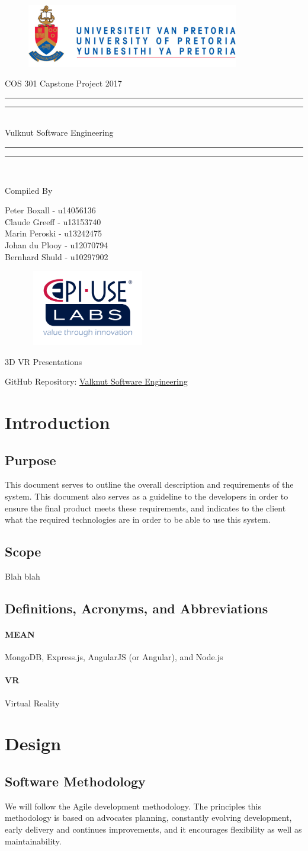 \documentclass{article}
\newcommand*{\titleGP}{\begingroup
		\begin{figure}[t]
			\centering
			\includegraphics[width=350px]{UP_Logo.PNG}
		\end{figure}		
\centering

{\Large COS 301 Capstone Project 2017}

\vspace*{\baselineskip}

\rule{\textwidth}{1.6pt}\vspace*{-\baselineskip}\vspace*{2pt}
\rule{\textwidth}{0.4pt}\\[\baselineskip]

{\Huge Vulknut Software Engineering } \\ [0.2\baselineskip]
\rule{\textwidth}{0.4pt}\vspace*{-\baselineskip}\vspace{3.2pt}
\rule{\textwidth}{1.6pt}\\[\baselineskip] %



\bigskip

Compiled By \\[\baselineskip]

\bigskip

{\Large Peter Boxall - u14056136 \\ Claude Greeff - u13153740 \\ Marin Peroski -  u13242475 \\ Johan du Plooy - u12070794 \\ Bernhard Shuld - u10297902 \\\par}

\bigskip
\bigskip
 
	\begin{figure}[H]
			\centering
			\includegraphics[width=200px,height=125px]{epiUse.PNG}
	\end{figure}
	
\bigskip
\bigskip

 {\Huge 3D VR Presentations}

\vfill
 
 	{\large GitHub Repository:  
 	\href{https://github.com/Valknut-Software-Engineering/Capstone_Project}{Valknut Software Engineering}\par} 

\endgroup}
\begin{document}
\titleGP
\newpage
\tableofcontents
\newpage

\section{Introduction}

	\subsection{Purpose}
	This document serves to outline the overall description and requirements of 	the system. This document also serves as a guideline to the developers in 		order to ensure the final product meets these requirements, and indicates 		to the client what the required technologies are in order to be able to use 	this system.
	
	\subsection{Scope}
	
	Blah blah	
	
	\subsection{Definitions, Acronyms, and Abbreviations}
			\paragraph{MEAN}	MongoDB, Express.js, AngularJS (or Angular), and Node.js
			\paragraph{VR}	Virtual Reality

\section{Design}

	\subsection{Software Methodology}
	We will follow the Agile development methodology. The principles this methodology is based on advocates planning, constantly evolving development, early delivery and continues improvements, and it encourages flexibility as well as maintainability.
	
\end{document}
